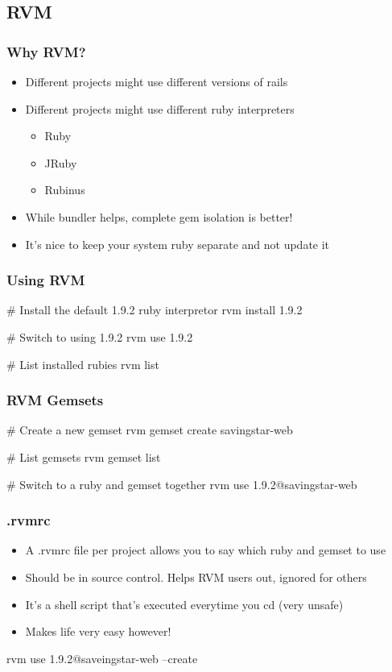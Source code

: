 \subsection{RVM}

\begin{frame}[fragile]
  \frametitle{Why RVM?}
  \begin{itemize}
  \item Different projects might use different versions of rails
  \pause
  \item Different projects might use different ruby interpreters
    \begin{itemize}
    \item Ruby
    \item JRuby
    \item Rubinus
    \end{itemize}
  \pause
  \item While bundler helps, complete gem isolation is better!
  \pause
  \item It's nice to keep your system ruby separate and not update it
  \end{itemize}
\end{frame}

\begin{frame}[fragile]
  \frametitle{Using RVM}
  \begin{console}
    # Install the default 1.9.2 ruby interpretor
    rvm install 1.9.2

    # Switch to using 1.9.2
    rvm use 1.9.2

    # List installed rubies
    rvm list
  \end{console}
\end{frame}

\begin{frame}[fragile]
  \frametitle{RVM Gemsets}
  \begin{console}
    # Create a new gemset
    rvm gemset create savingstar-web

    # List gemsets
    rvm gemset list

    # Switch to a ruby and gemset together
    rvm use 1.9.2@savingstar-web
  \end{console}
\end{frame}

\begin{frame}[fragile]
  \frametitle{.rvmrc}
  \begin{itemize}
  \item A .rvmrc file per project allows you to say which ruby and gemset to use
  \pause
  \item Should be in source control. Helps RVM users out, ignored for others
  \pause
  \item It's a shell script that's executed everytime you cd (very unsafe)
  \pause
  \item Makes life very easy however!
  \end{itemize}
  \pause
  \begin{rubycode}
    rvm use 1.9.2@saveingstar-web --create
  \end{rubycode}
\end{frame}


